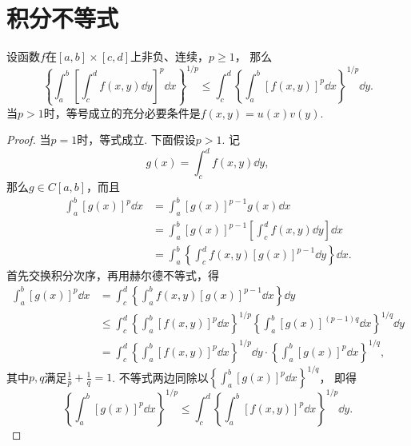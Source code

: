 \section{积分不等式}
\begin{theorem}[闵可夫斯基不等式]
设函数\(f\)在\([a,b]\times[c,d]\)上非负、连续，\(p\geq1\)，
那么\begin{equation}
	\left\{
		\int_a^b
		\left[
			\int_c^d f(x,y) \dd{y}
		\right]^p
		\dd{x}
	\right\}^{1/p}
	\leq
	\int_c^d
	\left\{
		\int_a^b
		\left[
			f(x,y)
		\right]^p
		\dd{x}
	\right\}^{1/p}
	\dd{y}.
\end{equation}
当\(p>1\)时，等号成立的充分必要条件是\(f(x,y) = u(x) v(y)\).
\begin{proof}
当\(p=1\)时，等式成立.
下面假设\(p>1\).
记\[
	g(x) = \int_c^d f(x,y) \dd{y},
\]
那么\(g \in C[a,b]\)，而且\begin{align*}
	\int_a^b \left[ g(x) \right]^p \dd{x}
	&= \int_a^b \left[ g(x) \right]^{p-1} g(x) \dd{x} \\
	&= \int_a^b \left[ g(x) \right]^{p-1} \left[ \int_c^d f(x,y) \dd{y} \right] \dd{x} \\
	&= \int_a^b \left\{ \int_c^d f(x,y) \left[ g(x) \right]^{p-1} \dd{y} \right\} \dd{x}.
\end{align*}
首先交换积分次序，再用赫尔德不等式，得\begin{align*}
	\int_a^b \left[ g(x) \right]^p \dd{x}
	&= \int_c^d \left\{ \int_a^b f(x,y) \left[ g(x) \right]^{p-1} \dd{x} \right\} \dd{y} \\
	&\leq
		\int_c^d
		\left\{
			\int_a^b \left[ f(x,y) \right]^p \dd{x}
		\right\}^{1/p}
		\left\{
			\int_a^b \left[ g(x) \right]^{(p-1)q} \dd{x}
		\right\}^{1/q}
		\dd{y} \\
	&= \int_c^d
		\left\{
			\int_a^b \left[ f(x,y) \right]^p \dd{x}
		\right\}^{1/p}
		\dd{y}
		\cdot
		\left\{
			\int_a^b \left[ g(x) \right]^p \dd{x}
		\right\}^{1/q},
\end{align*}
其中\(p,q\)满足\(\frac1p+\frac1q=1\).
不等式两边同除以\(\left\{
	\int_a^b \left[ g(x) \right]^p \dd{x}
\right\}^{1/q}\)，
即得\[
	\left\{
		\int_a^b
		\left[
			g(x)
		\right]^p
		\dd{x}
	\right\}^{1/p}
	\leq
	\int_c^d
	\left\{
		\int_a^b
		\left[
			f(x,y)
		\right]^p
		\dd{x}
	\right\}^{1/p}
	\dd{y}.
\]
\end{proof}
\end{theorem}

